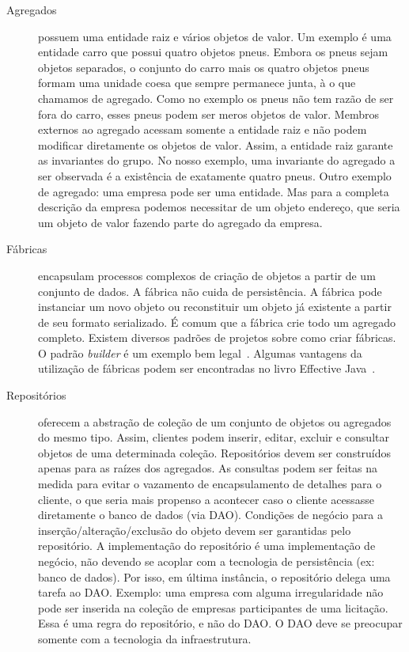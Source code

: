 \documentclass[a4paper, 12pt]{article}
\begin{document}
\begin{description}

\item [Agregados] possuem uma entidade raiz e vários objetos de valor. Um exemplo é uma entidade carro que possui quatro objetos pneus. Embora os pneus sejam objetos separados, o conjunto do carro mais os quatro objetos pneus formam uma unidade coesa que sempre permanece junta, à o que chamamos de agregado. Como no exemplo os pneus não tem razão de ser fora do carro, esses pneus podem ser meros objetos de valor. Membros externos ao agregado acessam somente a entidade raiz e não podem modificar diretamente os objetos de valor. Assim, a entidade raiz garante as invariantes do grupo. No nosso exemplo, uma invariante do agregado a ser observada é a existência de exatamente quatro pneus. Outro exemplo de agregado: uma empresa pode ser uma entidade. Mas para a completa descrição da empresa podemos necessitar de um objeto endereço, que seria um objeto de valor fazendo parte do agregado da empresa.

\item [Fábricas] encapsulam processos complexos de criação de objetos a partir de um conjunto de dados. A fábrica não cuida de persistência. A fábrica pode instanciar um novo objeto ou reconstituir um objeto já existente a partir de seu formato serializado. É comum que a fábrica crie todo um agregado completo.
Existem diversos padrões de projetos sobre como criar fábricas. O padrão \emph{builder} é um exemplo bem legal~\cite{Bloch2008Builder}. Algumas vantagens da utilização de fábricas podem ser encontradas no livro Effective Java~\cite{Bloch2008Factory}. 

\item [Repositórios] oferecem a abstração de coleção de um conjunto de objetos ou agregados do mesmo tipo. Assim, clientes podem inserir, editar, excluir e consultar objetos de uma determinada coleção. Repositórios devem ser construídos apenas para as raízes dos agregados. As consultas podem ser feitas na medida para evitar o vazamento de encapsulamento de detalhes para o cliente, o que seria mais propenso a acontecer caso o cliente acessasse diretamente o banco de dados (via DAO). Condições de negócio para a inserção/alteração/exclusão do objeto devem ser garantidas pelo repositório. A implementação do repositório é uma implementação de negócio, não devendo se acoplar com a tecnologia de persistência (ex: banco de dados). Por isso, em última instância, o repositório delega uma tarefa ao DAO. Exemplo: uma empresa com alguma irregularidade não pode ser inserida na coleção de empresas participantes de uma licitação. Essa é uma regra do repositório, e não do DAO. O DAO deve se preocupar somente com a tecnologia da infraestrutura.


\end{description}
\end{document}
